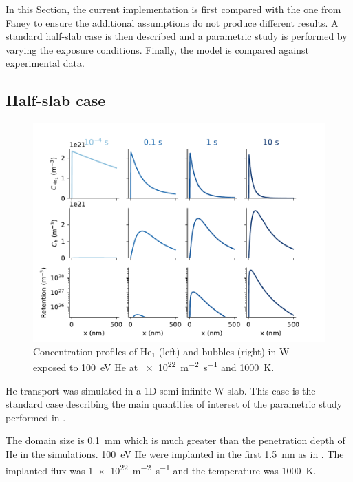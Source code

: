 In this Section, the current implementation is first compared with the one from Faney  to ensure the additional assumptions do not produce different results.
A standard half-slab case is then described and a parametric study is performed by varying the exposure conditions.
Finally, the model is compared against experimental data.

\subsection{Half-slab case} 

\begin{figure}
    \centering
    \includegraphics[width=\linewidth]{Figures/Chapter4/half_slab/profiles_half_slab.pdf}
    \caption{Concentration profiles of He$_1$ (left) and bubbles (right) in W exposed to \SI{100}{eV} He at \SI{e22}{m^{-2}.s^{-1}} and \SI{1000}{K}.}
\end{figure}

\gls{He} transport was simulated in a 1D semi-infinite \gls{W} slab.
This case is the standard case describing the main quantities of interest of the parametric study performed in .

The domain size is \SI{0.1}{mm} which is much greater than the penetration depth of \gls{He} in the simulations.
\SI{100}{eV} \gls{He} were implanted in the first \SI{1.5}{nm} as in .
The implanted flux was \SI{1e22}{m^{-2} s^{-1}} and the temperature was \SI{1000}{K}.

